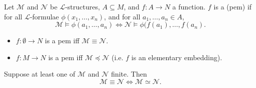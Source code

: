 \documentclass[notoc,notitlepage]{tufte-book}
\begin{document}
\begin{defn}\label{defn:partial_l_elementary_map}
  Let $\mathcal{M}$ and $\mathcal{N}$ be $\mathcal{L}$-structures, $A \subseteq M$, and $f : A \to N$ a function. $f$ is a  (pem) if for all $\mathcal{L}$-formulae $\phi(x_1, \ldots, x_n)$, and for all $a_1, \ldots, a_n \in A$,
  \begin{equation*}
    \mathcal{M} \models \phi(a_1, \ldots, a_n) \iff \mathcal{N} \models \phi(f(a_1), \ldots, f(a_n).
  \end{equation*}
\end{defn}

\begin{remark}
  \begin{itemize}
    \item $f : \emptyset \to N$ is a pem iff $\mathcal{M} \equiv \mathcal{N}$.
    \item $f : M \to N$ is a pem iff $\mathcal{M} \preceq \mathcal{N}$ (i.e. $f$ is an elementary embedding).
  \end{itemize}
\end{remark}

\begin{propo}\label{propo:elementary_equivalence_in_finite_stuctures}
  Suppose at least one of $\mathcal{M}$ and $\mathcal{N}$ finite. Then
  \begin{equation*}
    \mathcal{M} \equiv \mathcal{N} \iff \mathcal{M} \simeq \mathcal{N}.
  \end{equation*}
\end{propo}
\end{document}
